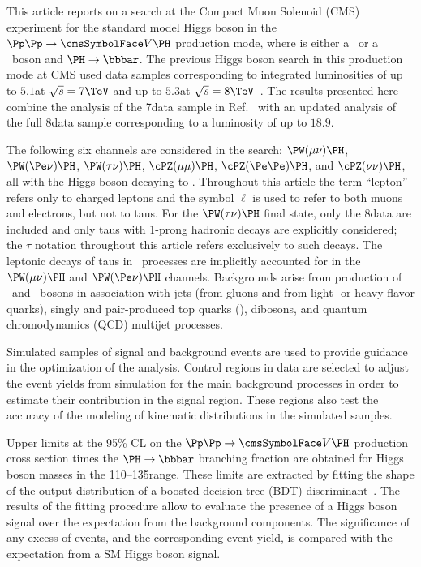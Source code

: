 \documentclass[11pt,twoside,a4paper,cmspaper,final,collab]{cms-tdr}
\begin{document}
This article reports on a search at the Compact Muon Solenoid (CMS) experiment for the standard model Higgs
boson in the $\Pp\Pp\to \VH$ production mode, where \Vvar is either a \PW\ or a \cPZ\ boson and $\PH\to \bbbar$.   The previous Higgs boson search in
this production mode at CMS used
data samples corresponding to integrated
luminosities of up to $5.1$\fbinv at $\sqrt{s}=7\TeV$ and
up to $5.3$\fbinv at $\sqrt{s}=8\TeV$~\cite{Chatrchyan:2013lba}.
The results presented here combine the analysis of the 7\TeV data
sample in Ref.~\cite{Chatrchyan:2013lba}
with an updated analysis of the full 8\TeV data sample corresponding to a luminosity of up to $18.9$\fbinv.


The following six channels are
considered in the search: $\PW(\mu\nu)\PH$,
   $\PW(\Pe\nu)\PH$,
$\PW(\tau\nu)\PH$, $\cPZ(\mu\mu)\PH$, $\cPZ(\Pe\Pe)\PH$, and
   $\cPZ(\nu\nu)\PH$, all
with the Higgs boson decaying to \bbbar. Throughout this article the term ``lepton''
refers only to charged leptons and the symbol
$\ell$ is used to refer to both muons and electrons, but not
to taus. For the
$\PW(\tau\nu)\PH$ final state, only the 8\TeV data are
included and only taus with 1-prong
hadronic decays are explicitly considered; the $\tau$ notation
throughout this article refers exclusively to such decays. The leptonic
decays of taus in \WH\ processes are implicitly accounted for in the
$\PW(\mu\nu)\PH$ and $\PW(\Pe\nu)\PH$
channels.
Backgrounds arise from production of \PW\ and \cPZ\  bosons in association with
jets (from gluons and from light- or heavy-flavor quarks), singly and pair-produced top quarks (\ttbar), dibosons, and
quantum chromodynamics (QCD) multijet processes.


Simulated samples of signal and background events are used to provide
guidance in the optimization of the analysis. Control regions in data
are selected to adjust the event yields from simulation for the main
background processes in order to estimate their contribution in the signal
region. These regions also test the accuracy of the modeling of kinematic
distributions in the simulated samples.


Upper limits at the 95\% CL on the
$\Pp\Pp\to \VH$ production cross section times the $\PH\to
\bbbar$ branching fraction are
obtained for Higgs boson masses in the
110--135\GeV range. These limits are extracted by fitting the shape
of the output distribution of a boosted-decision-tree (BDT)
discriminant~\cite{Roe:2004na,Hocker:2007ht}. The results of the fitting procedure
allow to evaluate the presence of a Higgs boson signal over the
expectation from the background components. The
significance of any excess of events, and the corresponding event yield, is compared
with the expectation from a SM Higgs boson signal.
\end{document}
